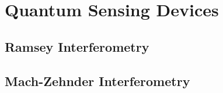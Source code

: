 \chapter{Quantum Sensing Devices}
\section{Ramsey Interferometry}
\section{Mach-Zehnder Interferometry}
